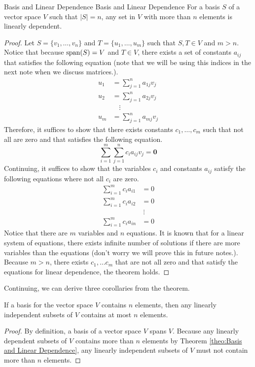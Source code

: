 \documentclass[../main.tex]{subfiles}
\begin{document}
\begin{theorem}{Basis and Linear Dependence}
{Basis and Linear Dependence}
For a basis $S$ of a vector space $V$ such that $|S| = n$, any set
in $V$ with more than $n$ elements is linearly dependent.
\end{theorem}
\begin{proof}
Let $S = \{ v_1, \ldots, v_n \}$ and $T = \{ u_1, \ldots, u_m \}$
such that $S, T \in V$ and $m > n$. Notice that because $\operatorname{span}(S) = V$
and $T \in V$, there exists a set of constants $a_{ij}$ that satisfies
the following equation (note that we will be using this indices in
the next note when we discuss matrices.).
\begin{align*}
    u_1 &= \sum_{j=1}^n a_{1j} v_j \\
    u_2 &= \sum_{j=1}^n a_{2j} v_j \\
    &\quad\vdots \\
    u_m &= \sum_{j=1}^n a_{mj} v_j
\end{align*}
Therefore, it suffices to show that there exists constants $c_1,
\ldots, c_m$ such that not all are zero and that satisfies the
following equation.
\[
\sum_{i=1}^m \sum_{j=1}^n c_i a_{ij} v_j
= \mathbf{0}
\]
Continuing, it suffices to show that the variables $c_i$ and constants
$a_{ij}$ satisfy the following equations where not all $c_i$ are zero.
\begin{align*}
    \sum_{i=1}^m c_i a_{i1} &= 0 \\
    \sum_{i=1}^m c_i a_{i2} &= 0 \\
    &\ \vdots \\
    \sum_{i=1}^m c_i a_{in} &= 0
\end{align*}
Notice that there are $m$ variables and $n$ equations. It is known
that for a linear system of equations, there exists infinite number
of solutions if there are more variables than the equations (don't
worry we will prove this in future notes.). Because $m > n$, there
exists $c_1, \ldots c_m$ that are not all zero and that satisfy the
equations for linear dependence, the theorem holds.
\end{proof}

Continuing, we can derive three corollaries from the theorem.

\begin{corollary}{}{}
If a basis for the vector space $V$ contains $n$ elements, then any
linearly independent subsets of $V$ contains at most $n$ elements.
\end{corollary}
\begin{proof}
By definition, a basis of a vector space $V$ spans $V$. Because any
linearly dependent subsets of $V$ contains more than $n$ elements
by Theorem \ref{theo:Basis and Linear Dependence}, any linearly
independent subsets of $V$ must not contain more than $n$ elements.
\end{proof}
\end{document}
